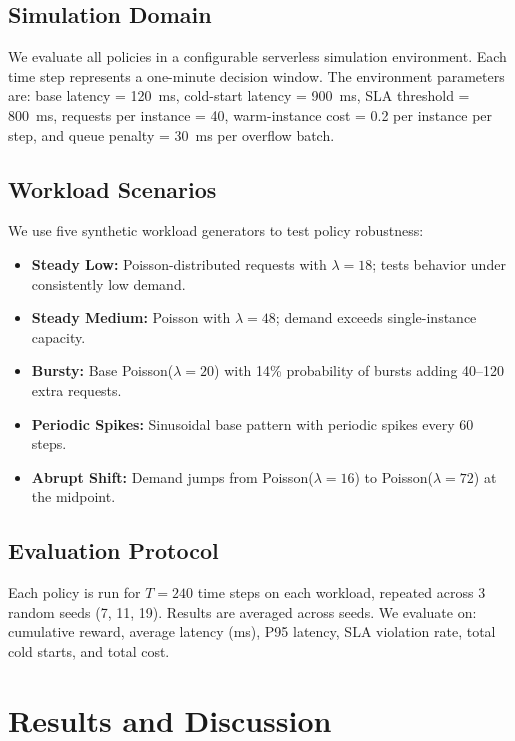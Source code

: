 \documentclass[11pt]{article}
\begin{document}
\subsection{Simulation Domain}

We evaluate all policies in a configurable serverless simulation environment. Each time step represents a one-minute decision window. The environment parameters are: base latency = 120~ms, cold-start latency = 900~ms, SLA threshold = 800~ms, requests per instance = 40, warm-instance cost = 0.2 per instance per step, and queue penalty = 30~ms per overflow batch.

\subsection{Workload Scenarios}

We use five synthetic workload generators to test policy robustness:
\begin{itemize}[nosep]
    \item \textbf{Steady Low:} Poisson-distributed requests with $\lambda = 18$; tests behavior under consistently low demand.
    \item \textbf{Steady Medium:} Poisson with $\lambda = 48$; demand exceeds single-instance capacity.
    \item \textbf{Bursty:} Base Poisson($\lambda=20$) with 14\% probability of bursts adding 40--120 extra requests.
    \item \textbf{Periodic Spikes:} Sinusoidal base pattern with periodic spikes every 60 steps.
    \item \textbf{Abrupt Shift:} Demand jumps from Poisson($\lambda=16$) to Poisson($\lambda=72$) at the midpoint.
\end{itemize}

\subsection{Evaluation Protocol}

Each policy is run for $T = 240$ time steps on each workload, repeated across 3 random seeds (7, 11, 19). Results are averaged across seeds. We evaluate on: cumulative reward, average latency (ms), P95 latency, SLA violation rate, total cold starts, and total cost.

\section{Results and Discussion}
\end{document}

